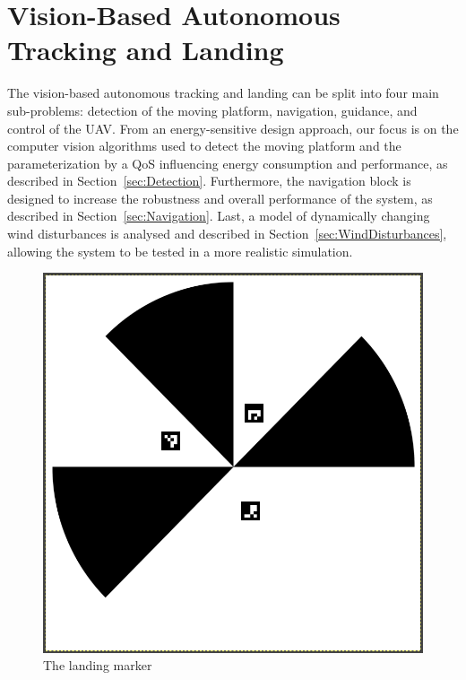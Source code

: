 \documentclass[conference, onecolumn, draftclsnofoot]{IEEEtran}
\begin{document}
\section{Vision-Based Autonomous Tracking and Landing}
\label{sec:landing}

The vision-based autonomous tracking and landing can be split into
four main sub-problems: detection of the moving platform, navigation,
guidance, and control of the UAV. From an energy-sensitive design
approach, our focus is on the computer vision algorithms used to
detect the moving platform and the parameterization by a QoS
influencing energy consumption and performance, as described in
Section~\ref{sec:Detection}. Furthermore, the navigation block is
designed to increase the robustness and overall performance of the
system, as described in Section~\ref{sec:Navigation}. Last, a model of
dynamically changing wind disturbances is analysed and described in
Section~\ref{sec:WindDisturbances}, allowing the system to be tested
in a more realistic simulation.


\begin{figure}
\centering
\includegraphics[scale=0.15]{n-fold-for-landing.png}
\caption{The landing marker}
\label{fig:LandingMarker}
\end{figure}
\end{document}
